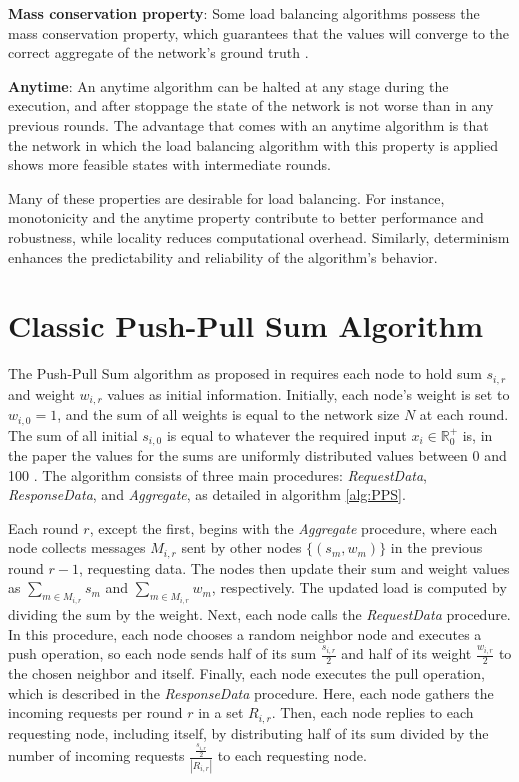 \textbf{Mass conservation property}: Some load balancing algorithms possess the mass conservation property, which guarantees that the values will converge to the correct aggregate of the network's ground truth \cite{nugroho2023PushPullSumDataAg}.

\textbf{Anytime}: An anytime algorithm can be halted at any stage during the execution, and after stoppage the state of the network is not worse than in any previous rounds. The advantage that comes with an anytime algorithm is that the network in which the load balancing algorithm with this property is applied shows more feasible states with intermediate rounds. \cite{Dinitz2023DAB}

Many of these properties are desirable for load balancing. For instance, monotonicity and the anytime property contribute to better performance and robustness, while locality reduces computational overhead. Similarly, determinism enhances the predictability and reliability of the algorithm's behavior.

\section{Classic Push-Pull Sum Algorithm}\label{sec:classicPPS}
The Push-Pull Sum algorithm as proposed in \cite{nugroho2023PushPullSumDataAg} requires each node to hold sum $s_{i,r}$ and weight $w_{i,r}$ values as initial information. Initially, each node's weight is set to $w_{i,0} = 1$, and the sum of all weights is equal to the network size $N$ at each round. The sum of all initial $s_{i,0}$ is equal to whatever the required input $x_i \in \mathbb{R}^{+}_{0}$ is, in the paper the values for the sums are uniformly distributed values between 0 and 100 \cite{nugroho2023PushPullSumDataAg}. The algorithm consists of three main procedures: \textit{RequestData}, \textit{ResponseData}, and \textit{Aggregate}, as detailed in algorithm \ref{alg:PPS}.

Each round $r$, except the first, begins with the \textit{Aggregate} procedure, where each node collects messages $M_{i,r}$ sent by other nodes $\{(s_m, w_m)\}$ in the previous round $r-1$, requesting data. The nodes then update their sum and weight values as $\sum_{m \in M_{i,r}}{s_m}$ and $\sum_{m \in M_{i,r}}{w_m}$, respectively. The updated load is computed by dividing the sum by the weight. Next, each node calls the \textit{RequestData} procedure. In this procedure, each node chooses a random neighbor node and executes a push operation, so each node sends half of its sum $\frac{s_{i,r}}{2}$ and half of its weight $\frac{w_{i,r}}{2}$ to the chosen neighbor and itself. Finally, each node executes the pull operation, which is described in the \textit{ResponseData} procedure. Here, each node gathers the incoming requests per round $r$ in a set $R_{i, r}$. Then, each node replies to each requesting node, including itself, by distributing half of its sum divided by the number of incoming requests $\frac{\frac{s_{i,r}}{2}}{|R_{i, r}|}$ to each requesting node.

